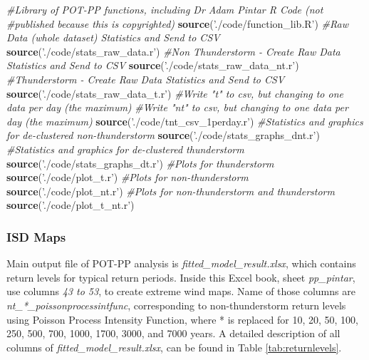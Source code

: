 \documentclass[12pt,twoside]{reedthesis}
\newenvironment{Shaded}{\begin{snugshade}}{\end{snugshade}}
\newcommand{\CommentTok}[1]{\textcolor[rgb]{0.56,0.35,0.01}{\textit{#1}}}
\newcommand{\KeywordTok}[1]{\textcolor[rgb]{0.13,0.29,0.53}{\textbf{#1}}}
\newcommand{\NormalTok}[1]{#1}
\newcommand{\StringTok}[1]{\textcolor[rgb]{0.31,0.60,0.02}{#1}}
\begin{document}
\vspace{0.4cm}
\begin{Shaded}
\begin{Highlighting}[]
    \CommentTok{#Library of POT-PP functions, including Dr Adam Pintar R Code (not }
    \CommentTok{#published because this is copyrighted)}
      \KeywordTok{source}\NormalTok{(}\StringTok{'./code/function_lib.R'}\NormalTok{)}
    \CommentTok{#Raw Data (whole dataset) Statistics and Send to CSV }
      \KeywordTok{source}\NormalTok{(}\StringTok{'./code/stats_raw_data.r'}\NormalTok{)}
    \CommentTok{#Non Thunderstorm - Create Raw Data Statistics and Send to CSV }
      \KeywordTok{source}\NormalTok{(}\StringTok{'./code/stats_raw_data_nt.r'}\NormalTok{)}
    \CommentTok{#Thunderstorm - Create Raw Data Statistics and Send to CSV}
      \KeywordTok{source}\NormalTok{(}\StringTok{'./code/stats_raw_data_t.r'}\NormalTok{)}
    \CommentTok{#Write "t" to csv, but changing to one data per day (the maximum)}
    \CommentTok{#Write "nt" to csv, but changing to one data per day (the maximum)}
      \KeywordTok{source}\NormalTok{(}\StringTok{'./code/tnt_csv_1perday.r'}\NormalTok{)}
    \CommentTok{#Statistics and graphics for de-clustered non-thunderstorm}
      \KeywordTok{source}\NormalTok{(}\StringTok{'./code/stats_graphs_dnt.r'}\NormalTok{)}
    \CommentTok{#Statistics and graphics for de-clustered thunderstorm}
      \KeywordTok{source}\NormalTok{(}\StringTok{'./code/stats_graphs_dt.r'}\NormalTok{)}
    \CommentTok{#Plots for thunderstorm}
      \KeywordTok{source}\NormalTok{(}\StringTok{'./code/plot_t.r'}\NormalTok{)}
    \CommentTok{#Plots for non-thunderstorm}
      \KeywordTok{source}\NormalTok{(}\StringTok{'./code/plot_nt.r'}\NormalTok{)}
    \CommentTok{#Plots for non-thunderstorm and thunderstorm}
      \KeywordTok{source}\NormalTok{(}\StringTok{'./code/plot_t_nt.r'}\NormalTok{)}
\end{Highlighting}
\end{Shaded}
\normalsize

\hypertarget{isd-maps}{%
\subsubsection{ISD Maps}\label{isd-maps}}

Main output file of POT-PP analysis is \emph{fitted\_model\_result.xlsx}, which contains return levels for typical return periods. Inside this Excel book, sheet \emph{pp\_pintar}, use columns \emph{43 to 53}, to create extreme wind maps. Name of those columns are \emph{nt\_*\_poissonprocessintfunc}, corresponding to non-thunderstorm return levels using Poisson Process Intensity Function, where * is replaced for 10, 20, 50, 100, 250, 500, 700, 1000, 1700, 3000, and 7000 years. A detailed description of all columns of \emph{fitted\_model\_result.xlsx}, can be found in Table \ref{tab:returnlevels}.
\end{document}
